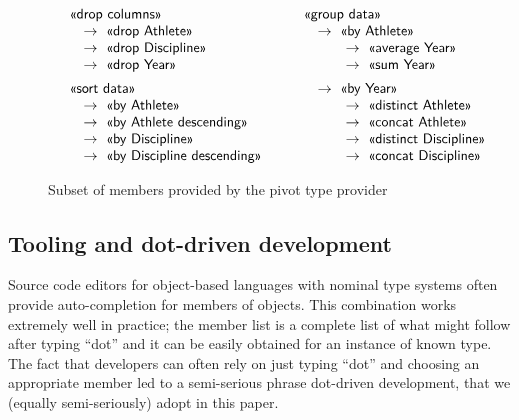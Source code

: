 \documentclass[a4paper,UKenglish]{lipics-v2016}
\theoremstyle{plain}
\theoremstyle{definition}
\newcommand{\qident}[1]{\textnormal{\sffamily \guillemotleft #1\guillemotright}}
\begin{document}
\begin{figure}
\begin{equation*}
\quad \begin{array}{l}
\qident{drop columns}\\
\quad\rightarrow~\qident{drop Athlete}\\
\quad\rightarrow~\qident{drop Discipline}\\
\quad\rightarrow~\qident{drop Year}\\[0.5em]
\qident{sort data}\\
\quad\rightarrow~\qident{by Athlete}\\
\quad\rightarrow~\qident{by Athlete descending}\\
\quad\rightarrow~\qident{by Discipline}\\
\quad\rightarrow~\qident{by Discipline descending}\\
\end{array}\qquad
\begin{array}{l}
\qident{group data}\\
\quad\rightarrow~\qident{by Athlete}\\
\qquad\quad\rightarrow~\qident{average Year}\\
\qquad\quad\rightarrow~\qident{sum Year}\\[0.5em] 
\quad\rightarrow~\qident{by Year}\\
\qquad\quad\rightarrow~\qident{distinct Athlete}\\
\qquad\quad\rightarrow~\qident{concat Athlete}\\
\qquad\quad\rightarrow~\qident{distinct Discipline}\\
\qquad\quad\rightarrow~\qident{concat Discipline}\\
\end{array}
\end{equation*}
\caption{Subset of members provided by the pivot type provider}
\label{fig:pivot-members}
\end{figure}

  
\subsection{Tooling and dot-driven development}
\label{sec:analysis-auto}

Source code editors for object-based languages with nominal type systems often provide 
auto-completion for members of objects. This combination works extremely well in practice; the
member list is a complete list of what might follow after typing ``dot'' and it can be easily
obtained for an instance of known type. The fact that developers can often rely on just typing
``dot'' and choosing an appropriate member led to a semi-serious phrase dot-driven development,
that we (equally semi-seriously) adopt in this paper.
\end{document}

